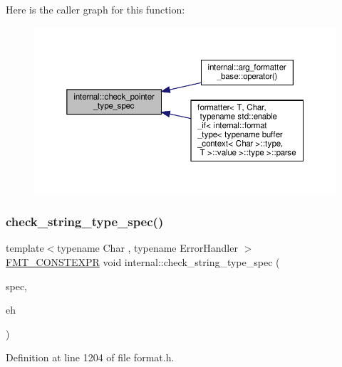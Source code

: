 Here is the caller graph for this function\+:
\nopagebreak
\begin{figure}[H]
\begin{center}
\leavevmode
\includegraphics[width=350pt]{namespaceinternal_a02f06fb6d5107704cd0d83a03c133905_icgraph}
\end{center}
\end{figure}
\mbox{\label{namespaceinternal_a3720624d15e22355851c82f9f2166c5a}} 
\subsubsection{\texorpdfstring{check\+\_\+string\+\_\+type\+\_\+spec()}{check\_string\_type\_spec()}}
{\footnotesize\ttfamily template$<$typename Char , typename Error\+Handler $>$ \\
\hyperlink{core_8h_a69201cb276383873487bf68b4ef8b4cd}{F\+M\+T\+\_\+\+C\+O\+N\+S\+T\+E\+X\+PR} void internal\+::check\+\_\+string\+\_\+type\+\_\+spec (\begin{DoxyParamCaption}\item[{Char}]{spec,  }\item[{Error\+Handler \&\&}]{eh }\end{DoxyParamCaption})}



Definition at line 1204 of file format.\+h.

